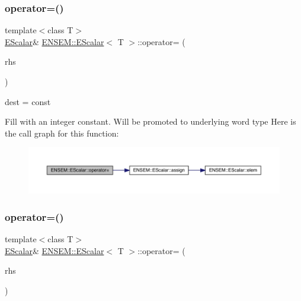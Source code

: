 \subsubsection{\texorpdfstring{operator=()}{operator=()}\hspace{0.1cm}{\footnotesize\ttfamily [3/12]}}
{\footnotesize\ttfamily template$<$class T$>$ \\
\mbox{\hyperlink{classENSEM_1_1EScalar}{E\+Scalar}}\& \mbox{\hyperlink{classENSEM_1_1EScalar}{E\+N\+S\+E\+M\+::\+E\+Scalar}}$<$ T $>$\+::operator= (\begin{DoxyParamCaption}\item[{const typename \mbox{\hyperlink{structENSEM_1_1WordType}{Word\+Type}}$<$ T $>$\+::Type\+\_\+t \&}]{rhs }\end{DoxyParamCaption})\hspace{0.3cm}{\ttfamily [inline]}}



dest = const 

Fill with an integer constant. Will be promoted to underlying word type Here is the call graph for this function\+:
\nopagebreak
\begin{figure}[H]
\begin{center}
\leavevmode
\includegraphics[width=350pt]{d0/d82/classENSEM_1_1EScalar_a01ae8ddc1b0d0e4ecd65f5de624faee5_cgraph}
\end{center}
\end{figure}
\mbox{\label{classENSEM_1_1EScalar_a9619fd24baf50fd03986c3056a484cb9}} 
\subsubsection{\texorpdfstring{operator=()}{operator=()}\hspace{0.1cm}{\footnotesize\ttfamily [4/12]}}
{\footnotesize\ttfamily template$<$class T$>$ \\
\mbox{\hyperlink{classENSEM_1_1EScalar}{E\+Scalar}}\& \mbox{\hyperlink{classENSEM_1_1EScalar}{E\+N\+S\+E\+M\+::\+E\+Scalar}}$<$ T $>$\+::operator= (\begin{DoxyParamCaption}\item[{const \mbox{\hyperlink{structENSEM_1_1Zero}{Zero}} \&}]{rhs }\end{DoxyParamCaption})\hspace{0.3cm}{\ttfamily [inline]}}



